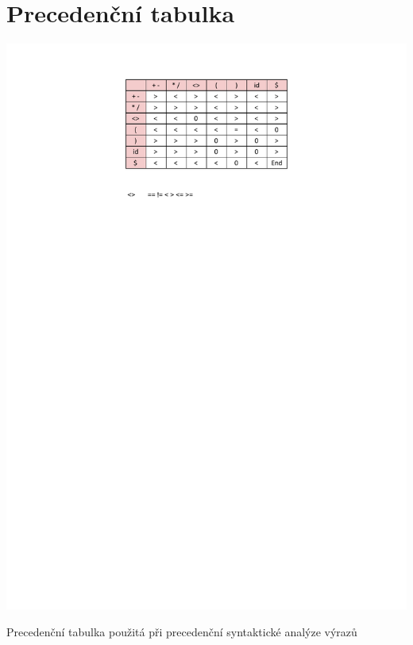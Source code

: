 \documentclass[a4paper, 12pt]{article}
\begin{document}
	\section{Precedenční tabulka}
	\begin{table}[!ht]
		\centering
		\includegraphics[width=0.7\linewidth]{precedence_table.pdf}
		\caption{Precedenční tabulka použitá při precedenční syntaktické analýze výrazů}
		\label{table:prec_table}
	\end{table}
\end{document}
